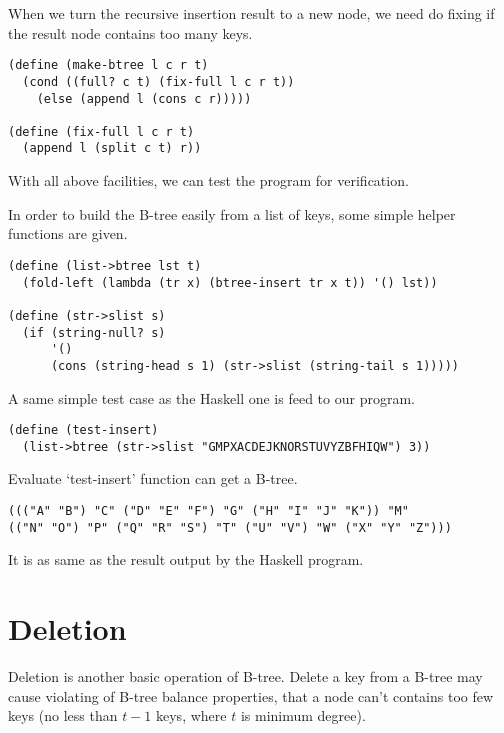\documentclass{article}
\begin{document}
When we turn the recursive insertion result to a new node, we
need do fixing if the result node contains too many keys.

\begin{lstlisting}
(define (make-btree l c r t)
  (cond ((full? c t) (fix-full l c r t))
	(else (append l (cons c r)))))

(define (fix-full l c r t)
  (append l (split c t) r))
\end{lstlisting}

With all above facilities, we can test the program for verification.

In order to build the B-tree easily from a list of keys, some simple
helper functions are given.

\begin{lstlisting}
(define (list->btree lst t)
  (fold-left (lambda (tr x) (btree-insert tr x t)) '() lst))

(define (str->slist s)
  (if (string-null? s)
      '()
      (cons (string-head s 1) (str->slist (string-tail s 1)))))
\end{lstlisting}

A same simple test case as the Haskell one is feed to our program.

\begin{lstlisting}
(define (test-insert)
  (list->btree (str->slist "GMPXACDEJKNORSTUVYZBFHIQW") 3))
\end{lstlisting}

Evaluate `test-insert' function can get a B-tree.

\begin{lstlisting}
((("A" "B") "C" ("D" "E" "F") "G" ("H" "I" "J" "K")) "M"
(("N" "O") "P" ("Q" "R" "S") "T" ("U" "V") "W" ("X" "Y" "Z")))
\end{lstlisting}

It is as same as the result output by the Haskell program.

\section{Deletion}

Deletion is another basic operation of B-tree. Delete a key from a
B-tree may cause violating of B-tree balance properties, that a node
can't contains too few keys (no less than $t-1$ keys, where $t$ is
minimum degree).
\end{document}
